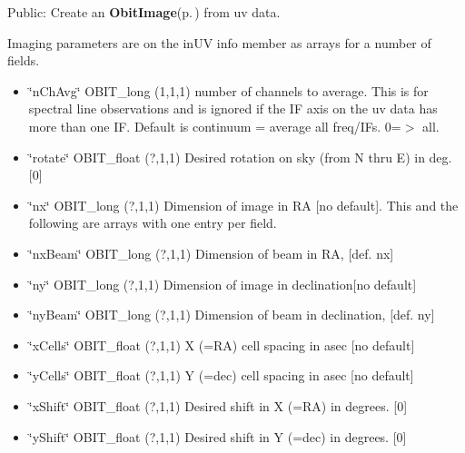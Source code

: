 Public: Create an {\bf Obit\-Image}{\rm (p.\,\pageref{structObitImage})} from uv data. 

Imaging parameters are on the in\-UV info member as arrays for a number of fields. \begin{itemize}
\item \char`\"{}n\-Ch\-Avg\char`\"{} OBIT\_\-long (1,1,1) number of channels to average. This is for spectral line observations and is ignored if the IF axis on the uv data has more than one IF. Default is continuum = average all freq/IFs. 0=$>$ all. \item \char`\"{}rotate\char`\"{} OBIT\_\-float (?,1,1) Desired rotation on sky (from N thru E) in deg. [0] \item \char`\"{}nx\char`\"{} OBIT\_\-long (?,1,1) Dimension of image in RA [no default]. This and the following are arrays with one entry per field. \item \char`\"{}nx\-Beam\char`\"{} OBIT\_\-long (?,1,1) Dimension of beam in RA, [def. nx] \item \char`\"{}ny\char`\"{} OBIT\_\-long (?,1,1) Dimension of image in declination[no default] \item \char`\"{}ny\-Beam\char`\"{} OBIT\_\-long (?,1,1) Dimension of beam in declination, [def. ny] \item \char`\"{}x\-Cells\char`\"{} OBIT\_\-float (?,1,1) X (=RA) cell spacing in asec [no default] \item \char`\"{}y\-Cells\char`\"{} OBIT\_\-float (?,1,1) Y (=dec) cell spacing in asec [no default] \item \char`\"{}x\-Shift\char`\"{} OBIT\_\-float (?,1,1) Desired shift in X (=RA) in degrees. [0] \item \char`\"{}y\-Shift\char`\"{} OBIT\_\-float (?,1,1) Desired shift in Y (=dec) in degrees. [0] 
\end{itemize}
